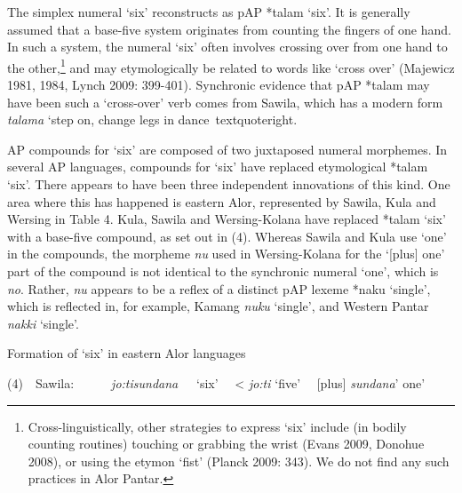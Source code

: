 The simplex numeral {\textquoteleft}six{\textquoteright} reconstructs as pAP *talam {\textquoteleft}six{\textquoteright}. It is generally assumed that a base-five system originates from counting the fingers of one hand. In such a system, the numeral {\textquoteleft}six{\textquoteright} often involves crossing over from one hand to the other,\footnote{Cross-linguistically, other strategies to express {\textquoteleft}six{\textquoteright} include (in bodily counting routines) touching or grabbing the wrist (Evans 2009, Donohue 2008), or using the etymon {\textquoteleft}fist{\textquoteright} (Planck 2009: 343). We do not find any such practices in Alor Pantar.} and may etymologically be related to words like {\textquoteleft}cross over{\textquoteright} (Majewicz 1981, 1984, Lynch 2009: 399-401). Synchronic evidence that pAP *talam may have been such a {\textquoteleft}cross-over{\textquoteright} verb comes from Sawila, which has a modern form \textit{talama{\ng} }{\textquoteleft}step on, change legs in dance{\
textquoteright}. 

AP compounds for {\textquoteleft}six{\textquoteright} are composed of two juxtaposed numeral morphemes. In several AP languages, compounds for {\textquoteleft}six{\textquoteright} have replaced etymological *talam {\textquoteleft}six{\textquoteright}. There appears to have been three independent innovations of this kind. One area where this has happened is eastern Alor, represented by Sawila, Kula and Wersing in Table 4. Kula, Sawila and Wersing-Kolana have replaced *talam {\textquoteleft}six{\textquoteright} with a base-five compound, as set out in (4). Whereas Sawila and Kula use {\textquoteleft}one{\textquoteright} in the compounds, the morpheme \textit{nu}\textit{{\ng}} used in Wersing-Kolana for the {\textquoteleft}[plus] one{\textquoteright} part of the compound is not identical to the synchronic numeral {\textquoteleft}one{\textquoteright}, which is \textit{no}. Rather, \textit{nu}\textit{{\ng}} appears to be a reflex of a distinct pAP lexeme *naku{\ng} {\textquoteleft}single{\textquoteright}, which 
is reflected in, for example, Kamang \textit{nuku}\textit{{\ng}}\textit{ }{\textquoteleft}single{\textquoteright}, and Western Pantar \textit{nakki}\textit{{\ng} }{\textquoteleft}single{\textquoteright}.

Formation of {\textquoteleft}six{\textquoteright} in eastern Alor languages

(4)\ \ Sawila:\ \ \ \ \ \ \textit{jo:ti}\textit{{\ng}}\textit{sundana}\textbf{ \ \ }{\textquoteleft}six{\textquoteright} \ \ {\textless} \textit{jo:ti}\textit{{\ng}} {\textquoteleft}five{\textquoteright} \ \ [plus] \textit{sundana}{\textquoteright} one{\textquoteright}

